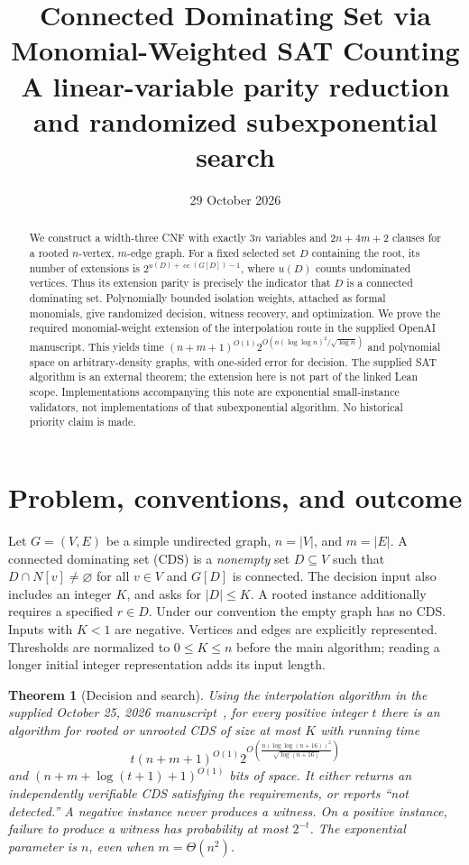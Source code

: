 \documentclass[11pt]{article}
\title{Connected Dominating Set via Monomial-Weighted SAT Counting\\
\large A linear-variable parity reduction and randomized subexponential search}
\author{}
\date{29 October 2026}
\newtheorem{theorem}{Theorem}
\theoremstyle{remark}\newtheorem{remark}[theorem]{Remark}
\newcommand{\cc}{\operatorname{cc}}
\newcommand{\rhoN}[1]{\frac{#1(\log\log(#1+16))^2}{\sqrt{\log(#1+16)}}}
\begin{document}
\maketitle
\begin{abstract}
We construct a width-three CNF with exactly $3n$ variables and
$2n+4m+2$ clauses for a rooted $n$-vertex, $m$-edge graph. For a fixed
selected set $D$ containing the root, its number of extensions is
$2^{u(D)+\cc(G[D])-1}$, where $u(D)$ counts undominated vertices.
Thus its extension parity is precisely the indicator that $D$ is a connected
dominating set. Polynomially bounded isolation weights, attached as formal
monomials, give randomized decision, witness recovery, and optimization.
We prove the required monomial-weight extension of the interpolation route
in the supplied OpenAI manuscript. This yields time
$(n+m+1)^{O(1)}2^{O(n(\log\log n)^2/\sqrt{\log n})}$ and polynomial
space on arbitrary-density graphs, with one-sided error for decision.
The supplied SAT algorithm is an external theorem; the extension here is
not part of the linked Lean scope. Implementations accompanying this note
are exponential small-instance validators, not implementations of that
subexponential algorithm. No historical priority claim is made.
\end{abstract}

\section{Problem, conventions, and outcome}
Let $G=(V,E)$ be a simple undirected graph, $n=|V|$, and $m=|E|$.
A connected dominating set (CDS) is a \emph{nonempty} set $D\subseteq V$
such that $D\cap N[v]\ne\varnothing$ for all $v\in V$ and $G[D]$ is
connected. The decision input also includes an integer $K$, and asks for
$|D|\le K$. A rooted instance additionally requires a specified $r\in D$.
Under our convention the empty graph has no CDS. Inputs with $K<1$ are
negative. Vertices and edges are explicitly represented.
Thresholds are normalized to $0\le K\le n$ before the main algorithm;
reading a longer initial integer representation adds its input length.

\begin{theorem}[Decision and search]\label{thm:main}
Using the interpolation algorithm in the supplied October 25, 2026
manuscript~\cite{oai}, for every positive integer $t$ there is an algorithm
for rooted or unrooted CDS of size at most $K$ with running time
\[
 t(n+m+1)^{O(1)}2^{O(\rhoN{n})}
\]
and $(n+m+\log(t+1)+1)^{O(1)}$ bits of space. It either returns an
independently verifiable CDS satisfying the requirements, or reports
``not detected.'' A negative instance never produces a witness. On a
positive instance, failure to produce a witness has probability at most
$2^{-t}$. The exponential parameter is $n$, even when $m=\Theta(n^2)$.
\end{theorem}
\end{document}
